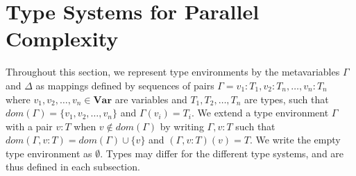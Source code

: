 \chapter{Type Systems for Parallel Complexity}\label{sec:typesyst}

Throughout this section, we represent type environments by the metavariables $\Gamma$ and $\Delta$ as mappings defined by sequences of pairs $\Gamma = v_1 : T_1,v_2 : T_n,\dots,v_n : T_n$ where $v_1,v_2,\dots,v_n \in \mathbf{Var}$ are variables and $T_1,T_2,\dots,T_n$ are types, such that $\textit{dom}(\Gamma) = \{v_1,v_2,\dots,v_n\}$ and $\Gamma(v_i) = T_i$. We extend a type environment $\Gamma$ with a pair $v : T$ when $v \notin \textit{dom}(\Gamma)$ by writing $\Gamma, v : T$ such that $\textit{dom}(\Gamma, v : T) = \textit{dom}(\Gamma) \cup \{v\}$ and $(\Gamma, v : T)(v) = T$. We write the empty type environment as $\emptyset$. Types may differ for the different type systems, and are thus defined in each subsection.




